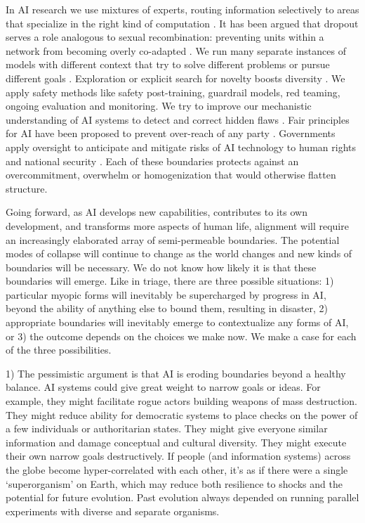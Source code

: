 \documentclass[12pt]{article}
\begin{document}
In AI research we use mixtures of experts, routing information selectively to areas that specialize in the right kind of computation \citep{shazeer2017outrageously}. It has been argued that dropout serves a role analogous to sexual recombination: preventing units within a network from becoming overly co-adapted \citep{srivastava2014dropout}. We run many separate instances of models with different context that try to solve different problems or pursue different goals \citep{hammond2025multi, guo2024large, qian2024chatdev}. Exploration or explicit search for novelty boosts diversity \citep{lehman2011abandoning, bellemare2016unifying, pathak2017curiosity, schwartenbeck2013exploration}. We apply safety methods like safety post-training, guardrail models, red teaming, ongoing evaluation and monitoring. We try to improve our mechanistic understanding of AI systems to detect and correct hidden flaws \citep{olah2020zoom, burns2022discovering, bereska2024mechanistic, anthropic2024mapping}. Fair principles for AI have been proposed to prevent over-reach of any party \citep{gabriel2025matter}. Governments apply oversight to anticipate and mitigate risks of AI technology to human rights and national security \citep{eu2024aiact, uk2023bletchley, us2023eo14110}. Each of these boundaries protects against an overcommitment, overwhelm or homogenization that would otherwise flatten structure.

Going forward, as AI develops new capabilities, contributes to its own development, and transforms more aspects of human life, alignment will require an increasingly elaborated array of semi-permeable boundaries. The potential modes of collapse will continue to change as the world changes and new kinds of boundaries will be necessary. We do not know how likely it is that these boundaries will emerge. Like in triage, there are three possible situations: 1) particular myopic forms will inevitably be supercharged by progress in AI, beyond the ability of anything else to bound them, resulting in disaster, 2) appropriate boundaries will inevitably emerge to contextualize any forms of AI, or 3) the outcome depends on the choices we make now. We make a case for each of the three possibilities.

1) The pessimistic argument is that AI is eroding boundaries beyond a healthy balance. AI systems could give great weight to narrow goals or ideas. For example, they might facilitate rogue actors building weapons of mass destruction. They might reduce ability for democratic systems to place checks on the power of a few individuals or authoritarian states. They might give everyone similar information and damage conceptual and cultural diversity. They might execute their own narrow goals destructively. If people (and information systems) across the globe become hyper-correlated with each other, it's as if there were a single `superorganism' on Earth, which may reduce both resilience to shocks and the potential for future evolution. Past evolution always depended on running parallel experiments with diverse and separate organisms. 
\end{document}

